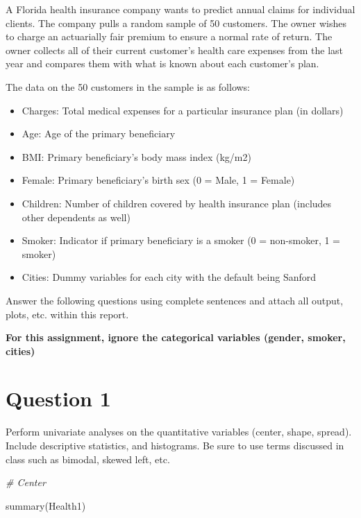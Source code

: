 \documentclass[
]{article}
\newenvironment{Shaded}{\begin{snugshade}}{\end{snugshade}}
\newcommand{\CommentTok}[1]{\textcolor[rgb]{0.56,0.35,0.01}{\textit{#1}}}
\newcommand{\FunctionTok}[1]{\textcolor[rgb]{0.00,0.00,0.00}{#1}}
\newcommand{\NormalTok}[1]{#1}
\providecommand{\tightlist}{%
  \setlength{\itemsep}{0pt}\setlength{\parskip}{0pt}}
\begin{document}
A Florida health insurance company wants to predict annual claims for
individual clients. The company pulls a random sample of 50 customers.
The owner wishes to charge an actuarially fair premium to ensure a
normal rate of return. The owner collects all of their current
customer's health care expenses from the last year and compares them
with what is known about each customer's plan.

The data on the 50 customers in the sample is as follows:

\begin{itemize}
\tightlist
\item
  Charges: Total medical expenses for a particular insurance plan (in
  dollars)
\item
  Age: Age of the primary beneficiary
\item
  BMI: Primary beneficiary's body mass index (kg/m2)
\item
  Female: Primary beneficiary's birth sex (0 = Male, 1 = Female)
\item
  Children: Number of children covered by health insurance plan
  (includes other dependents as well)
\item
  Smoker: Indicator if primary beneficiary is a smoker (0 = non-smoker,
  1 = smoker)
\item
  Cities: Dummy variables for each city with the default being Sanford
\end{itemize}

Answer the following questions using complete sentences and attach all
output, plots, etc. within this report.

\textbf{For this assignment, ignore the categorical variables (gender,
smoker, cities)}

\hypertarget{question-1}{%
\section{Question 1}\label{question-1}}

Perform univariate analyses on the quantitative variables (center,
shape, spread). Include descriptive statistics, and histograms. Be sure
to use terms discussed in class such as bimodal, skewed left, etc.

\begin{Shaded}
\begin{Highlighting}[]
\CommentTok{\# Center }

\FunctionTok{summary}\NormalTok{(Health1)}
\end{Highlighting}
\end{Shaded}
\end{document}
